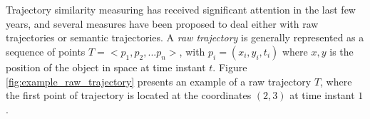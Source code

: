 


%


\chapter{}
Trajectory similarity measuring has received significant attention in the last few years, and several measures have been proposed to deal either with raw trajectories or semantic trajectories. A \emph{raw trajectory} is generally represented as a sequence of points $T=<p_1, p_2, ...p_n>$, with $p_i=(x_i,y_i,t_i)$ where $x,y$ is the position of the object in space at time instant $t$. Figure \ref{fig:example_raw_trajectory} presents an example of a raw trajectory $T$, where the first point of trajectory is located at the coordinates $(2,3)$ at time instant $1$.

